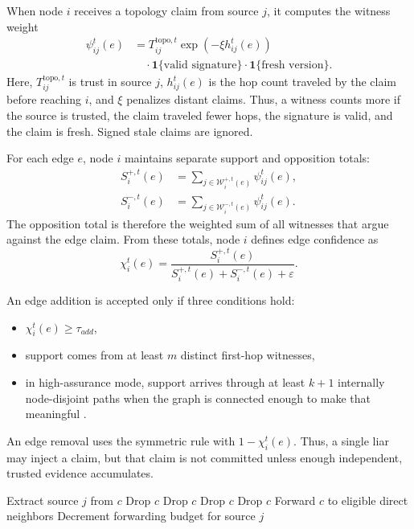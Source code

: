 \documentclass[journal]{IEEEtran}
\theoremstyle{definition}
\theoremstyle{remark}
\begin{document}
When node $i$ receives a topology claim from source $j$, it computes the witness weight
\begin{equation}
\begin{aligned}
\psi_{ij}^t(e)
&= T_{ij}^{\text{topo},t}
   \exp\!\left(-\xi h_{ij}^t(e)\right) \\
&\quad \cdot \mathbf{1}\{\text{valid signature}\}
       \cdot \mathbf{1}\{\text{fresh version}\}.
\end{aligned}
\end{equation}
Here, $T_{ij}^{\text{topo},t}$ is trust in source $j$, $h_{ij}^t(e)$ is the hop count traveled by the claim before reaching $i$, and $\xi$ penalizes distant claims. Thus, a witness counts more if the source is trusted, the claim traveled fewer hops, the signature is valid, and the claim is fresh. Signed stale claims are ignored.

For each edge $e$, node $i$ maintains separate support and opposition totals:
\begin{align}
S_i^{+,t}(e) &= \sum_{j \in \mathcal{W}_i^{+,t}(e)} \psi_{ij}^t(e), \\
S_i^{-,t}(e) &= \sum_{j \in \mathcal{W}_i^{-,t}(e)} \psi_{ij}^t(e).
\end{align}
The opposition total is therefore the weighted sum of all witnesses that argue against the edge claim. From these totals, node $i$ defines edge confidence as
\begin{equation}
\chi_i^t(e) =
\frac{S_i^{+,t}(e)}{S_i^{+,t}(e)+S_i^{-,t}(e)+\varepsilon}.
\end{equation}

An edge addition is accepted only if three conditions hold:
\begin{itemize}[leftmargin=2em]
\item $\chi_i^t(e) \ge \tau_{add}$,
\item support comes from at least $m$ distinct first-hop witnesses,
\item in high-assurance mode, support arrives through at least $k+1$ internally node-disjoint paths when the graph is connected enough to make that meaningful \cite{nesterenko2009discovering}.
\end{itemize}
An edge removal uses the symmetric rule with $1-\chi_i^t(e)$. Thus, a single liar may inject a claim, but that claim is not committed unless enough independent, trusted evidence accumulates.

\begin{algorithm}[t]
\caption{Controlled forwarding}
\label{alg:forward}
\begin{algorithmic}[1]
\State Extract source $j$ from $c$
    \State Drop $c$
    \State Drop $c$
    \State Drop $c$
    \State Drop $c$
\Else
    \State Forward $c$ to eligible direct neighbors
    \State Decrement forwarding budget for source $j$
\EndIf
\end{algorithmic}
\end{algorithm}
\end{document}

